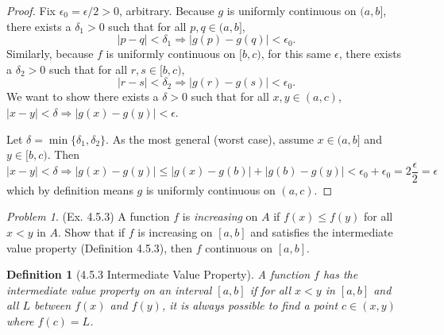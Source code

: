 \documentclass[11pt,twoside, reqno]{amsart}
\newtheorem{Def}[Thm]{Definition}
\theoremstyle{remark}
\newtheorem{Prob}{Problem}
\renewcommand{\implies}{\Rightarrow}
\begin{document}
\begin{proof}
Fix $\epsilon_0 = \epsilon / 2 > 0$, arbitrary. Because $g$ is uniformly continuous on $(a,b]$, there exists a $\delta_1 > 0$ such that for all $p,q \in (a,b]$, 
$$
    |p-q| < \delta_1 \implies |g(p) - g(q)| < \epsilon_0.
$$
Similarly, because $f$ is uniformly continuous on $[b,c)$, for this same $\epsilon$, there exists a $\delta_2 > 0$ such that for all $r,s \in [b,c)$,
$$
    |r-s| < \delta_2 \implies |g(r) - g(s)| < \epsilon_0.
$$
We want to show there exists a $\delta > 0$ such that for all $x,y \in (a,c)$, $|x-y| < \delta \implies |g(x) - g(y)| < \epsilon$.

Let $\delta = \min \{\delta_1, \delta_2\}$. As the most general (worst case), assume $x \in (a,b]$ and $y \in [b,c)$. Then
$$
    |x - y| < \delta \implies |g(x) - g(y)| \leq |g(x) - g(b)| + |g(b) - g(y)| < \epsilon_0 + \epsilon_0 = 2 \frac{\epsilon}{2} = \epsilon
$$
which by definition means $g$ is uniformly continuous on $(a,c)$.

\end{proof}

\begin{Prob}(Ex. 4.5.3) A function $f$ is \textit{increasing} on $A$ if $f(x) \leq f(y)$ for all $x < y$ in $A$. Show that if $f$ is increasing on $[a,b]$ and satisfies the intermediate value property (Definition 4.5.3), then $f$ continuous on $[a,b]$.

\begin{Def} [4.5.3 Intermediate Value Property]
    A function $f$ has the \textit{intermediate value property} on an interval $[a,b]$ if for all $x < y$ in $[a,b]$ and all $L$ between $f(x)$ and $f(y)$, it is always possible to find a point $c \in (x,y)$ where $f(c) = L$.
\end{Def}
\end{Prob}
\end{document}
